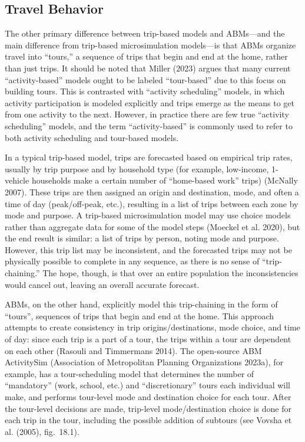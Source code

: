 \documentclass[fancy, oneside, mastersfancy, ms]{byuthesis}
\begin{document}
\subsection{Travel Behavior}\label{travel-behavior}

The other primary difference between trip-based models and ABMs---and
the main difference from trip-based microsimulation models---is that
ABMs organize travel into ``tours,'' a sequence of trips that begin and
end at the home, rather than just trips. It should be noted that Miller
(2023) argues that many current ``activity-based'' models ought to be
labeled ``tour-based'' due to this focus on building tours. This is
contrasted with ``activity scheduling'' models, in which activity
participation is modeled explicitly and trips emerge as the means to get
from one activity to the next. However, in practice there are few true
``activity scheduling'' models, and the term ``activity-based'' is
commonly used to refer to both activity scheduling and tour-based
models.

In a typical trip-based model, trips are forecasted based on empirical
trip rates, usually by trip purpose and by household type (for example,
low-income, 1-vehicle households make a certain number of ``home-based
work'' trips) (McNally 2007). These trips are then assigned an origin
and destination, mode, and often a time of day (peak/off-peak, etc.),
resulting in a list of trips between each zone by mode and purpose. A
trip-based microsimulation model may use choice models rather than
aggregate data for some of the model steps (Moeckel et al. 2020), but
the end result is similar: a list of trips by person, noting mode and
purpose. However, this trip list may be inconsistent, and the forecasted
trips may not be physically possible to complete in any sequence, as
there is no sense of ``trip-chaining.'' The hope, though, is that over
an entire population the inconsistencies would cancel out, leaving an
overall accurate forecast.

ABMs, on the other hand, explicitly model this trip-chaining in the form
of ``tours'', sequences of trips that begin and end at the home. This
approach attempts to create consistency in trip origins/destinations,
mode choice, and time of day: since each trip is a part of a tour, the
trips within a tour are dependent on each other (Rasouli and Timmermans
2014). The open-source ABM ActivitySim (Association of Metropolitan
Planning Organizations 2023a), for example, has a tour-scheduling model
that determines the number of ``mandatory'' (work, school, etc.) and
``discretionary'' tours each individual will make, and performs
tour-level mode and destination choice for each tour. After the
tour-level decisions are made, trip-level mode/destination choice is
done for each trip in the tour, including the possible addition of
subtours (see Vovsha et al. (2005), fig.~18.1).
\end{document}
